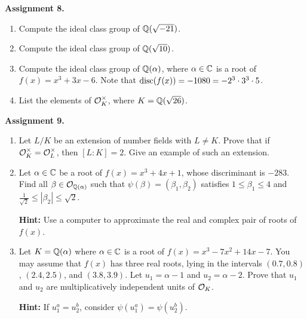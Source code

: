 {\bf Assignment 8.} 
\begin{enumerate}[leftmargin=1.5cm, label={{\bf A8-\arabic*}}]
    \item \label{A8-1} Compute the ideal class group of $\mathbb{Q}(\sqrt{-21})$.
    \item \label{A8-2} Compute the ideal class group of $\mathbb{Q}(\sqrt{10})$.
    \item \label{A8-3} Compute the ideal class group of $\mathbb{Q}(\alpha)$, 
    where $\alpha \in \mathbb{C}$ is a root of $f(x) = x^3 + 3x - 6$. Note that 
    $\operatorname{disc}(f(x)) = -1080 = -2^3 \cdot 3^3 \cdot 5$.
    \item \label{A8-4} List the elements of ${\cal O}_K^\times$, where 
    $K = \mathbb{Q}(\sqrt{26})$.
\end{enumerate}

{\bf Assignment 9.} 
\begin{enumerate}[leftmargin=1.5cm, label={{\bf A9-\arabic*}}]
    \item \label{A9-1} Let $L/K$ be an extension of number fields with $L \neq K$.
    Prove that if ${\cal O}_K^\times = {\cal O}_L^\times$, then $[L : K] = 2$. 
    Give an example of such an extension. 
    \item \label{A9-2} Let $\alpha \in \mathbb{C}$ be a root of $f(x) = x^3 + 4x + 1$, 
    whose discriminant is $-283$. Find all $\beta \in {\cal O}_{\mathbb{Q}(\alpha)}$ 
    such that $\psi(\beta) = (\beta_1, \beta_2)$ satisfies 
    $1 \leq \beta_1 \leq 4$ and $\frac{1}{\sqrt{2}} \leq |\beta_2| \leq \sqrt{2}$. 

    {\bf Hint:} Use a computer to approximate the real and complex pair 
    of roots of $f(x)$. 
    \item \label{A9-3} Let $K = \mathbb{Q}(\alpha)$ where $\alpha \in \mathbb{C}$ is a root of 
    $f(x) = x^3 - 7x^2 + 14x - 7$. You may assume that $f(x)$ has three real 
    roots, lying in the intervals $(0.7, 0.8)$, $(2.4, 2.5)$, and $(3.8, 3.9)$.
    Let $u_1 = \alpha - 1$ and $u_2 = \alpha - 2$. Prove that $u_1$ and $u_2$ 
    are multiplicatively independent units of ${\cal O}_K$. 

    {\bf Hint:} If $u_1^a = u_2^b$, consider $\psi(u_1^a) = \psi(u_2^b)$. 
\end{enumerate}